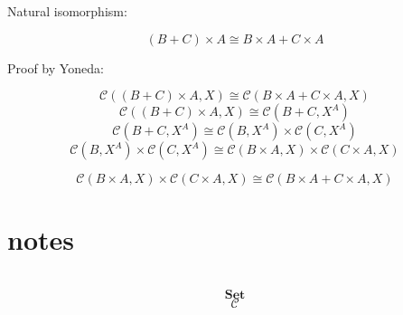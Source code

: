 \documentclass[DaoFP]{subfiles}
\begin{document}
Natural isomorphism:

\[(B + C) \times A \cong B \times A + C \times A \]

Proof by Yoneda:

\[  \mathcal{C} ((B + C) \times A, X) \cong \mathcal{C}(B \times A + C \times A, X) \]
\[  \mathcal{C} ((B + C) \times A, X) \cong \mathcal{C}(B + C, X^A) \]
\[  \mathcal{C}(B + C, X^A) \cong \mathcal{C}(B, X^A) \times \mathcal{C}(C, X^A)\]
\[  \mathcal{C}(B, X^A) \times \mathcal{C}(C, X^A) \cong \mathcal{C}(B \times A, X) \times \mathcal{C}(C \times A, X)\]

\[ \mathcal{C}(B \times A, X) \times \mathcal{C}(C \times A, X) \cong \mathcal{C}(B \times A + C \times A, X) \]

\section{notes}





\begin{exercise}
\end{exercise}
\begin{haskell}
\end{haskell}
\[
 \begin{tikzcd}
  \end{tikzcd}
\]

\[   \mathbf{Set} \]
\[   \mathcal{C} \]
\end{document}
